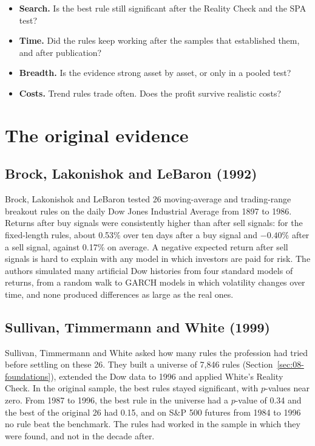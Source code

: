 \begin{itemize}
  \item \textbf{Search.} Is the best rule still significant after the Reality Check and the SPA test?
  \item \textbf{Time.} Did the rules keep working after the samples that established them, and after publication?
  \item \textbf{Breadth.} Is the evidence strong asset by asset, or only in a pooled test?
  \item \textbf{Costs.} Trend rules trade often. Does the profit survive realistic costs?
\end{itemize}

\section{The original evidence}
\label{sec:08-evidence}

\subsection{Brock, Lakonishok and LeBaron (1992)}

Brock, Lakonishok and LeBaron tested 26 moving-average and trading-range breakout rules on the daily Dow Jones Industrial Average from 1897 to 1986. Returns after buy signals were consistently higher than after sell signals: for the fixed-length rules, about 0.53\% over ten days after a buy signal and $-0.40\%$ after a sell signal, against 0.17\% on average. A negative expected return after sell signals is hard to explain with any model in which investors are paid for risk. The authors simulated many artificial Dow histories from four standard models of returns, from a random walk to GARCH models in which volatility changes over time, and none produced differences as large as the real ones.

\subsection{Sullivan, Timmermann and White (1999)}

Sullivan, Timmermann and White asked how many rules the profession had tried before settling on these 26. They built a universe of 7,846 rules (Section~\ref{sec:08-foundations}), extended the Dow data to 1996 and applied White's Reality Check. In the original sample, the best rules stayed significant, with $p$-values near zero. From 1987 to 1996, the best rule in the universe had a $p$-value of 0.34 and the best of the original 26 had 0.15, and on S\&P 500 futures from 1984 to 1996 no rule beat the benchmark. The rules had worked in the sample in which they were found, and not in the decade after.

